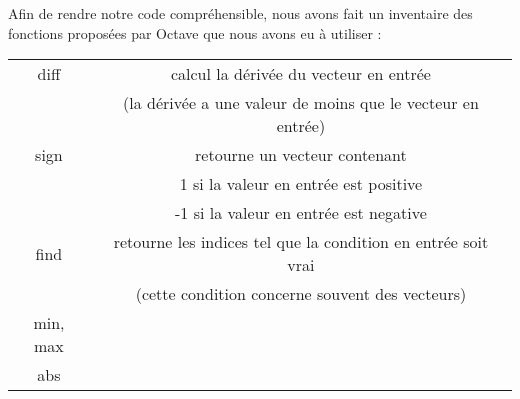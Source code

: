 Afin de rendre notre code compréhensible, nous avons fait un inventaire des fonctions proposées 
par Octave que nous avons eu à utiliser : 

\begin{center} 
\begin{tabular}{|c|c|}
  \hline 
    diff & calcul la dérivée du vecteur en entrée \\
    &(la dérivée a une valeur de moins que le vecteur en entrée)\\
  \hline 
    sign & retourne un vecteur contenant\\
    & 1 si la valeur en entrée est positive\\
    & -1 si la valeur en entrée est negative\\
  \hline 
    find & retourne les indices tel que la condition en entrée soit vrai\\
    &(cette condition concerne souvent des vecteurs)\\
  \hline 
    min, max & \\
  \hline 
    abs & \\
  \hline 
\end{tabular}
\end{center}
